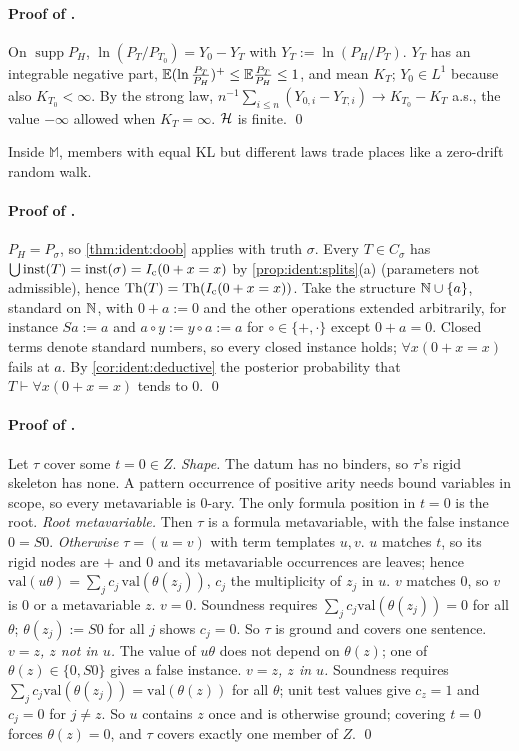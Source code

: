 \paragraph{Proof of .} On $\operatorname{supp}P_H$, $\ln(P_T/P_{T_0})=Y_0-Y_T$ with $Y_T:=\ln(P_H/P_T)$. $Y_T$ has an integrable negative part, $\mathbb{E}(\ln\frac{P_T}{P_H})^+\le\mathbb{E}\frac{P_T}{P_H}\le1$, and mean $K_T$; $Y_0\in L^1$ because also $K_{T_0}<\infty$. By the strong law, $n^{-1}\sum_{i\le n}(Y_{0,i}-Y_{T,i})\to K_{T_0}-K_T$ a.s., the value $-\infty$ allowed when $K_T=\infty$. $\mathcal{H}$ is finite. \qed

Inside $\mathbb M$, members with equal KL but different laws trade places like a zero-drift random walk.

\paragraph{Proof of .} $P_H=P_\sigma$, so \cref{thm:ident:doob} applies with truth $\sigma$. Every $T\in C_\sigma$ has $\bigcup\mathrm{inst}(T)=\mathrm{inst}(\sigma)=I_{\mathrm{c}}(0+x=x)$ by \cref{prop:ident:splits}(a) (parameters not admissible), hence $\mathrm{Th}(T)=\mathrm{Th}(I_{\mathrm{c}}(0+x=x))$. Take the structure $\mathbb{N}\cup\{a\}$, standard on $\mathbb{N}$, with $0+a:=0$ and the other operations extended arbitrarily, for instance $Sa:=a$ and $a\circ y:=y\circ a:=a$ for $\circ\in\{+,\cdot\}$ except $0+a=0$. Closed terms denote standard numbers, so every closed instance holds; $\forall x(0+x=x)$ fails at $a$. By \cref{cor:ident:deductive} the posterior probability that $T\vdash\forall x(0+x=x)$ tends to $0$. \qed

\paragraph{Proof of .} Let $\tau$ cover some $t=0\in Z$.
\emph{Shape.} The datum has no binders, so $\tau$'s rigid skeleton has none. A pattern occurrence of positive arity needs bound variables in scope, so every metavariable is $0$-ary. The only formula position in $t=0$ is the root.
\emph{Root metavariable.} Then $\tau$ is a formula metavariable, with the false instance $0=S0$.
\emph{Otherwise} $\tau=(u=v)$ with term templates $u,v$. $u$ matches $t$, so its rigid nodes are $+$ and $0$ and its metavariable occurrences are leaves; hence $\mathrm{val}(u\theta)=\sum_jc_j\,\mathrm{val}(\theta(z_j))$, $c_j$ the multiplicity of $z_j$ in $u$. $v$ matches $0$, so $v$ is $0$ or a metavariable $z$.
\emph{$v=0$.} Soundness requires $\sum_jc_j\mathrm{val}(\theta(z_j))=0$ for all $\theta$; $\theta(z_j):=S0$ for all $j$ shows $c_j=0$. So $\tau$ is ground and covers one sentence.
\emph{$v=z$, $z$ not in $u$.} The value of $u\theta$ does not depend on $\theta(z)$; one of $\theta(z)\in\{0,S0\}$ gives a false instance.
\emph{$v=z$, $z$ in $u$.} Soundness requires $\sum_jc_j\mathrm{val}(\theta(z_j))=\mathrm{val}(\theta(z))$ for all $\theta$; unit test values give $c_z=1$ and $c_j=0$ for $j\ne z$. So $u$ contains $z$ once and is otherwise ground; covering $t=0$ forces $\theta(z)=0$, and $\tau$ covers exactly one member of $Z$. \qed

